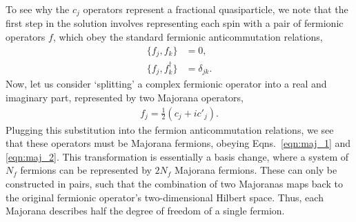 To see why the $c_j$ operators represent a fractional quasiparticle, we note that the first step in the solution involves representing each spin with a pair of fermionic operators $f$, which obey the standard fermionic anticommutation relations, 
\begin{align} 
    \{ f_j ,f_k \} &= 0, \\ 
    \{ f_j ,f_k^\dag \} &= \delta_{jk}.
\end{align}
Now, let us consider `splitting' a complex fermionic operator into a real and imaginary part, represented by two Majorana operators,
\begin{align} 
    f_j = \frac 12 (c_j + i c'_j).
\end{align}
Plugging this substitution into the fermion anticommutation relations, we see that these operators must be Majorana fermions, obeying Eqns.~\ref{eqn:maj_1} and \ref{eqn:maj_2}. This transformation is essentially a basis change, where a system of $N_f$ fermions can be represented by $2 N_f$ Majorana fermions. These can only be constructed in pairs, such that the combination of two Majoranas maps back to the original fermionic operator's two-dimensional Hilbert space. Thus, each Majorana describes half the degree of freedom of a single fermion.

